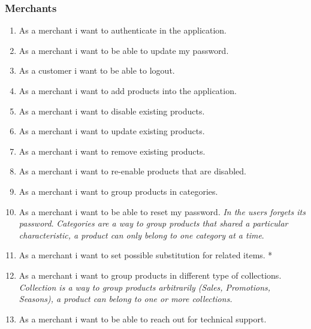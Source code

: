 \subsubsection{Merchants}
\begin{enumerate}[label=USR-\arabic*]
    \item As a merchant i want to authenticate in the application.
    \item As a merchant i want to be able to update my password.
    \item As a customer i want to be able to logout.
    \item As a merchant i want to add products into the application.
    \item As a merchant i want to disable existing products.
    \item As a merchant i want to update existing products.
    \item As a merchant i want to remove existing products.
    \item As a merchant i want to re-enable products that are disabled.
    \item As a merchant i want to group products in categories.
    \item As a merchant i want to be able to reset my password. \textit{In 
    the users forgets its password}.
    \textit{Categories are a way to group products that shared a particular 
    characteristic, a product can only belong to one category at a time}.
    \item As a merchant i want to set possible substitution for related items. *
    \item As a merchant i want to group products in different type of 
    collections. \textit{Collection is a way to group products arbitrarily 
    (Sales, Promotions, Seasons), a product can belong to one or more 
    collections.}
    \item As a merchant i want to be able to reach out for technical support.
\end{enumerate}
\pagebreak

